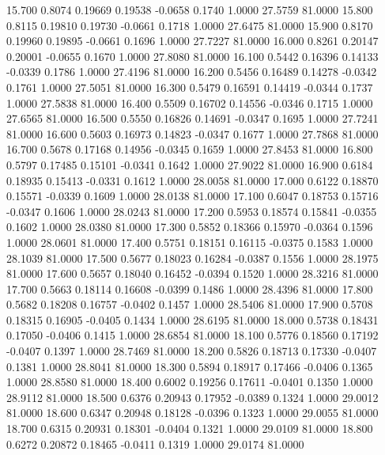   15.700   0.8074   0.19669   0.19538  -0.0658   0.1740   1.0000  27.5759  81.0000
  15.800   0.8115   0.19810   0.19730  -0.0661   0.1718   1.0000  27.6475  81.0000
  15.900   0.8170   0.19960   0.19895  -0.0661   0.1696   1.0000  27.7227  81.0000
  16.000   0.8261   0.20147   0.20001  -0.0655   0.1670   1.0000  27.8080  81.0000
  16.100   0.5442   0.16396   0.14133  -0.0339   0.1786   1.0000  27.4196  81.0000
  16.200   0.5456   0.16489   0.14278  -0.0342   0.1761   1.0000  27.5051  81.0000
  16.300   0.5479   0.16591   0.14419  -0.0344   0.1737   1.0000  27.5838  81.0000
  16.400   0.5509   0.16702   0.14556  -0.0346   0.1715   1.0000  27.6565  81.0000
  16.500   0.5550   0.16826   0.14691  -0.0347   0.1695   1.0000  27.7241  81.0000
  16.600   0.5603   0.16973   0.14823  -0.0347   0.1677   1.0000  27.7868  81.0000
  16.700   0.5678   0.17168   0.14956  -0.0345   0.1659   1.0000  27.8453  81.0000
  16.800   0.5797   0.17485   0.15101  -0.0341   0.1642   1.0000  27.9022  81.0000
  16.900   0.6184   0.18935   0.15413  -0.0331   0.1612   1.0000  28.0058  81.0000
  17.000   0.6122   0.18870   0.15571  -0.0339   0.1609   1.0000  28.0138  81.0000
  17.100   0.6047   0.18753   0.15716  -0.0347   0.1606   1.0000  28.0243  81.0000
  17.200   0.5953   0.18574   0.15841  -0.0355   0.1602   1.0000  28.0380  81.0000
  17.300   0.5852   0.18366   0.15970  -0.0364   0.1596   1.0000  28.0601  81.0000
  17.400   0.5751   0.18151   0.16115  -0.0375   0.1583   1.0000  28.1039  81.0000
  17.500   0.5677   0.18023   0.16284  -0.0387   0.1556   1.0000  28.1975  81.0000
  17.600   0.5657   0.18040   0.16452  -0.0394   0.1520   1.0000  28.3216  81.0000
  17.700   0.5663   0.18114   0.16608  -0.0399   0.1486   1.0000  28.4396  81.0000
  17.800   0.5682   0.18208   0.16757  -0.0402   0.1457   1.0000  28.5406  81.0000
  17.900   0.5708   0.18315   0.16905  -0.0405   0.1434   1.0000  28.6195  81.0000
  18.000   0.5738   0.18431   0.17050  -0.0406   0.1415   1.0000  28.6854  81.0000
  18.100   0.5776   0.18560   0.17192  -0.0407   0.1397   1.0000  28.7469  81.0000
  18.200   0.5826   0.18713   0.17330  -0.0407   0.1381   1.0000  28.8041  81.0000
  18.300   0.5894   0.18917   0.17466  -0.0406   0.1365   1.0000  28.8580  81.0000
  18.400   0.6002   0.19256   0.17611  -0.0401   0.1350   1.0000  28.9112  81.0000
  18.500   0.6376   0.20943   0.17952  -0.0389   0.1324   1.0000  29.0012  81.0000
  18.600   0.6347   0.20948   0.18128  -0.0396   0.1323   1.0000  29.0055  81.0000
  18.700   0.6315   0.20931   0.18301  -0.0404   0.1321   1.0000  29.0109  81.0000
  18.800   0.6272   0.20872   0.18465  -0.0411   0.1319   1.0000  29.0174  81.0000
